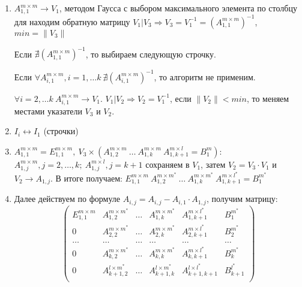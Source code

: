 \documentclass[12pt]{article}
\begin{document}
        \begin{enumerate}
            
            \item \label{alg:reverse} $ A^{m \times m}_{1,1} \rightarrow V_{1} $, методом Гаусса с выбором
            максимального элемента по столбцу для находим обратную матрицу $V_{1} | V_{3} \Rightarrow V_{3} = V_{1}^{-1}
            =  (A^{m \times m}_{1,1})^{-1}$, $min = \| V_{3} \|  $ 
            
            Если $ \nexists (A^{m \times m}_{1,1})^{-1}$, то выбираем следующую строчку.
            
            Если $\forall A^{m \times m}_{i,1}, i = 1, \ldots k \ \nexists (A^{m \times m}_{i,1})^{-1}$,
            то алгоритм не применим.
            
            $\forall i = 2, \ldots k \ A^{m \times m}_{i,1} \rightarrow V_{1}$.
            $V_{1} | V_{2} \Rightarrow V_{2} = V_{1}^{-1}$, если $\| V_{2} \| < min$, 
            то меняем местами указатели $V_{3}$ и $V_{2}$.   
            
            \item \label{alg:swap} $I_{i} \leftrightarrow I_{1}$ (строчки)
            
            \item \label{alg:mult} 
            $A_{1,1}^{m \times m} = E_{1,1}^{m \times m}, \ V_{3} \times (A_{1,2}^{m \times m} \ \ldots \ A_{1,k}^{m \times m} \ A_{1,k+1}^{m \times l}
             = B^{m}_{1})$: \\
            $A_{1,j}^{m \times m}, j = 2, \ldots, k; \ A_{1,j}^{m \times l}, j = k + 1$ сохраняем в $V_{1}$,
            затем $V_{2} = V_{3} \cdot V_{1}$ и $V_{2} \rightarrow A_{1,j}$.
            В итоге получаем: $ E_{1,1}^{m \times m} \ A_{1,2}^{m \times m^*}    \ \ldots \ A_{1,k}^{m \times m^*} \ A_{1,k+1}^{m \times l^*} = B^{m^*}_{1}$
            
            \item  \label{alg:form} Далее действуем по формуле $A_{i, j} = A_{i, j} - A_{i,1} \cdot A_{1,j}$, получим матрицу:
            \[
            \left(
            \begin{array}{ccccc|c}
                E_{1,1}^{m \times m} & A_{1,2}^{m \times m^*}   & \ldots & A_{1,k}^{m \times m^*}   & A_{1,k+1}^{m \times l^*}    & B^{m^*}_{1}   \\  
                0                    & A_{2,2}^{m \times m^*}   & \ldots & A_{2,k}^{m \times m^*}   & A_{2,k+1}^{m \times l^*}    & B^{m^*}_{2}   \\  
                \ldots               & \ldots                   & \ldots & \ldots                   & \ldots                      & \ldots        \\  
                0                    & A_{k,2}^{m \times m^*}   & \ldots & A_{k,k}^{m \times m^*}   & A_{k,k+1}^{m \times l^*}    & B^{m^*}_{k}   \\  
                0                    & A_{k+1,2}^{l \times m^*} & \ldots & A_{k+1,k}^{l \times m^*} & A_{k+1, k+1}^{l \times l^*} & B^{l^*}_{k+1} \\  
            \end{array}
            \right)
            \]


\end{enumerate}
\end{document}
